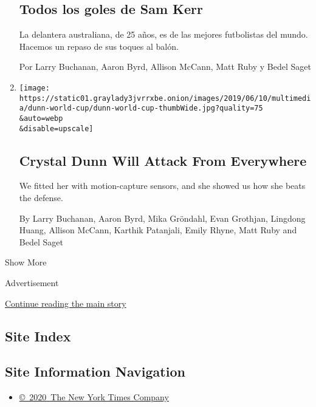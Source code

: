 \begin{enumerate}
{  \subsection{Todos los goles de Sam
  Kerr}\label{todos-los-goles-de-sam-kerr}}

  La delantera australiana, de 25 años, es de las mejores futbolistas
  del mundo. Hacemos un repaso de sus toques al balón.

  Por Larry Buchanan, Aaron Byrd, Allison McCann, Matt Ruby y Bedel
  Saget
\item
  \href{/interactive/2019/06/11/sports/world-cup/crystal-dunn-world-cup.html}{}

  \texttt{[image: https://static01.graylady3jvrrxbe.onion/images/2019/06/10/multimedia/dunn-world-cup/dunn-world-cup-thumbWide.jpg?quality=75\\\&auto=webp\\\&disable=upscale]}

  \hypertarget{crystal-dunn-will-attack-from-everywhere}{%
  \subsection{Crystal Dunn Will Attack From
  Everywhere}\label{crystal-dunn-will-attack-from-everywhere}}

  We fitted her with motion-capture sensors, and she showed us how she
  beats the defense.

  By Larry Buchanan, Aaron Byrd, Mika Gröndahl, Evan Grothjan, Lingdong
  Huang, Allison McCann, Karthik Patanjali, Emily Rhyne, Matt Ruby and
  Bedel Saget
\end{enumerate}

Show More

Advertisement

\protect\hyperlink{after-mid2}{Continue reading the main story}

\hypertarget{site-index}{%
\subsection{Site Index}\label{site-index}}

\hypertarget{site-information-navigation}{%
\subsection{Site Information
Navigation}\label{site-information-navigation}}

\begin{itemize}
\tightlist
\item
  \href{https://help.nytimes3xbfgragh.onion/hc/en-us/articles/115014792127-Copyright-notice}{©~2020~The
  New York Times Company}
\end{itemize}

